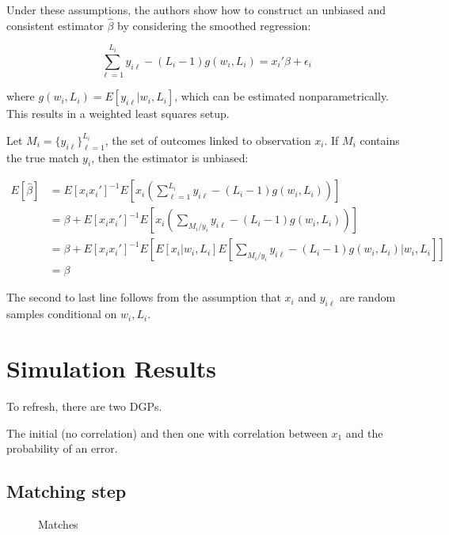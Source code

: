 \documentclass[12pt]{article}
\begin{document}
Under these assumptions, the authors show how to construct an unbiased and consistent estimator $\hat{\beta}$ by considering the smoothed regression:

\begin{equation} 
\sum_{\ell=1}^{L_i} y_{i\ell} - (L_i - 1)g(w_i, L_i) = x_i'\beta + \epsilon_i \end{equation}

\noindent where $g(w_i, L_i) = E[y_{i\ell} | w_i, L_i ]$, which can be estimated nonparametrically.   This results in a weighted least squares setup.  

Let $M_i = \{y_{i\ell}\}_{\ell=1}^{L_i}$, the set of outcomes linked to observation $x_i$.  If $M_i$ contains the true match $y_i$,  then the estimator is unbiased:  

\begin{align*} E[\hat{\beta}] &= E[x_ix_i']^{-1}E\left[x_i\left( \sum_{\ell = 1}^{L_i} y_{i\ell}- (L_i-1)g(w_i,L_i) \right) \right] \\
&=\beta + E[x_ix_i']^{-1} E\left[ x_i \left(\sum_{M_i / y_i} y_{i\ell} - (L_i -1) g(w_i, L_i)\right)\right] \\ 
&= \beta +  E[x_ix_i']^{-1} E\left[ E[x_i |w_i, L_i] E\left[\sum_{M_i / y_i} y_{i\ell} - (L_i -1) g(w_i, L_i) | w_i, L_i \right] \right]  \\
&= \beta \end{align*} 

The second to last line follows from the assumption that $x_i$ and $y_{i\ell}$ are random samples conditional on $w_i, L_i$.  

\section{Simulation Results}
To refresh, there are two DGPs. 

The initial (no correlation) and then one with correlation between $x_1$ and the probability of an error. 

\subsection{Matching step}
\begin{figure}[htbp]
\caption{Matches}
\begin{center}


\label{default}
\end{center}
\end{figure}
\end{document}

